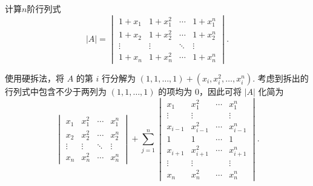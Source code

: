 \begin{exercise}
\begin{exgroup}
        \item 计算$n$阶行列式
        \[|A|=\begin{vmatrix}
                1+x_1  & 1+x_1^2 & \cdots & 1+x_1^n \\
                1+x_2  & 1+x_2^2 & \cdots & 1+x_2^n \\
                \vdots & \vdots  & \ddots & \vdots  \\
                1+x_n  & 1+x_n^2 & \cdots & 1+x_n^n
            \end{vmatrix}.\]
        \begin{answer}
            使用硬拆法，将 $A$ 的第 $i$ 行分解为 $(1, 1, \ldots, 1) + (x_i, x_i^2, \ldots, x_i^n)$. 考虑到拆出的行列式中包含不少于两列为 $(1, 1, \ldots, 1)$ 的项均为 $0$，因此可将 $|A|$ 化简为
            \[
                \begin{vmatrix}
                    x_1    & x_1^2  & \cdots & x_1^n  \\
                    x_2    & x_2^2  & \cdots & x_2^n  \\
                    \vdots & \vdots & \ddots & \vdots \\
                    x_n    & x_n^2  & \cdots & x_n^n
                \end{vmatrix} + \sum_{j=1}^n \begin{vmatrix}
                    x_1     & x_1^2     & \cdots & x_1^n     \\
                    \vdots  & \vdots    &        & \vdots    \\
                    x_{i-1} & x_{i-1}^2 & \cdots & x_{i-1}^n \\
                    1       & 1         & \cdots & 1         \\
                    x_{i+1} & x_{i+1}^2 & \cdots & x_{i+1}^n \\
                    \vdots  & \vdots    &        & \vdots    \\
                    x_n     & x_n^2     & \cdots & x_n^n
                \end{vmatrix}.
            \]


\end{answer}
\end{exgroup}
\end{exercise}
